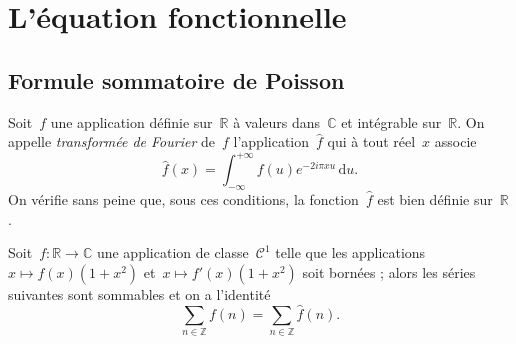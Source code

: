 \section{L'équation fonctionnelle}
	\subsection[Formule sommatoire de Poisson]{Formule sommatoire de Poisson}
		
		\begin{defi}
			Soit~$f$ une application définie sur~$\mathbb{R}$ à valeurs dans~$\mathbb{C}$ et intégrable sur~$\mathbb{R}$. On appelle \emph{transformée de Fourier} de~$f$ l'application~$\hat{f}$ qui à tout réel~$x$ associe
			\[
				\hat{f}(x) = \int_{-\infty}^{+\infty} f(u) e^{-2i\pi xu} \,\mathrm{d}u.
			\]
			On vérifie sans peine que, sous ces conditions, la fonction~$\hat{f}$ est bien définie sur~$\mathbb{R}$.
		\end{defi}
		\begin{thm}\label{thm:somPoisson}
			Soit~$f : \mathbb{R}\rightarrow\mathbb{C}$ une application de classe~$\mathscr{C}^1$ telle que les applications~$x\mapsto f(x)(1+x^2)$ et~$x\mapsto f'(x)(1+x^2)$ soit bornées ; alors les séries suivantes sont sommables et on a l'identité
			\[
				\sum_{n\in\mathbb{Z}} f(n) = \sum_{n\in\mathbb{Z}} \hat{f}(n).
			\]
		\end{thm}
